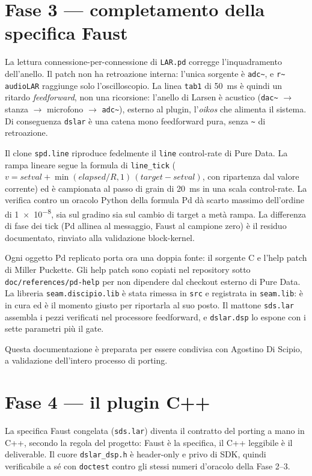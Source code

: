 \documentclass[11pt,a4paper]{article}
\begin{document}
\section{Fase 3 — completamento della specifica Faust}\label{sec:fase3}
La lettura connessione-per-connessione di \texttt{LAR.pd} corregge l'inquadramento dell'anello.
Il patch non ha retroazione interna: l'unica sorgente è \texttt{adc\textasciitilde{}}, e \texttt{r\textasciitilde{} audioLAR} raggiunge solo l'oscilloscopio.
La linea \texttt{tab1} di \SI{50}{\milli\second} è quindi un ritardo \emph{feedforward}, non una ricorsione: l'anello di Larsen è acustico (\texttt{dac\textasciitilde{}} $\to$ stanza $\to$ microfono $\to$ \texttt{adc\textasciitilde{}}), esterno al plugin, l'\emph{oikos} che alimenta il sistema.
Di conseguenza \texttt{dslar} è una catena mono feedforward pura, senza \texttt{\textasciitilde} di retroazione.

Il clone \texttt{spd.line} riproduce fedelmente il \texttt{line} control-rate di Pure Data.
La rampa lineare segue la formula di \texttt{line\_tick} ($v = \mathit{setval} + \min(\mathit{elapsed}/R,1)\,(\mathit{target}-\mathit{setval})$, con ripartenza dal valore corrente) ed è campionata al passo di grain di \SI{20}{\milli\second} in una scala control-rate.
La verifica contro un oracolo Python della formula Pd dà scarto massimo dell'ordine di \num{1e-8}, sia sul gradino sia sul cambio di target a metà rampa.
La differenza di fase dei tick (Pd allinea al messaggio, Faust al campione zero) è il residuo documentato, rinviato alla validazione block-kernel.

Ogni oggetto Pd replicato porta ora una doppia fonte: il sorgente C e l'help patch di Miller Puckette.
Gli help patch sono copiati nel repository sotto \texttt{doc/references/pd-help} per non dipendere dal checkout esterno di Pure Data.
La libreria \texttt{seam.discipio.lib} è stata rimessa in \texttt{src} e registrata in \texttt{seam.lib}: è in cura ed è il momento giusto per riportarla al suo posto.
Il mattone \texttt{sds.lar} assembla i pezzi verificati nel processore feedforward, e \texttt{dslar.dsp} lo espone con i sette parametri più il gate.

Questa documentazione è preparata per essere condivisa con Agostino Di Scipio, a validazione dell'intero processo di porting.

\section{Fase 4 — il plugin C++}\label{sec:fase4}
La specifica Faust congelata (\texttt{sds.lar}) diventa il contratto del porting a mano in C++, secondo la regola del progetto: Faust è la specifica, il C++ leggibile è il deliverable.
Il cuore \texttt{dslar\_dsp.h} è header-only e privo di SDK, quindi verificabile a sé con \texttt{doctest} contro gli stessi numeri d'oracolo della Fase 2--3.
\end{document}
